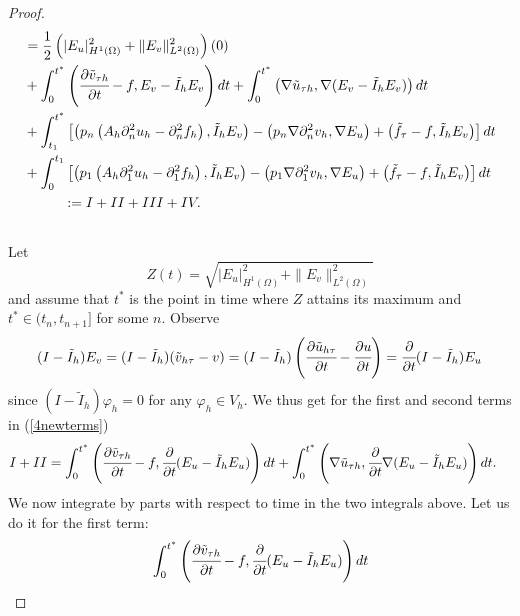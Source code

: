 \documentclass{imanum}
\begin{document}
\begin{proof}
\begin{align}
  &=
  {\frac{1}{2}} \left(|E_{u}|^{2}_{H^1(\Omega)}+\| E_{v}\|_{L^2(\Omega)}^{2}\right)(0)
  \notag\\
  &+ \int_{0}^{t^{{\ast}}}\left(\cfrac{{\partial\tilde{v}_{{\tau} h}}}{\partial t}-f, E_{v}-\tilde I_{h} E_{v}\right) d t
  +\int_{0}^{t^{{\ast}}}\left({\nabla} \tilde{u}_{{\tau} h},{\nabla} ( E_{v}-\tilde I_{h}  E_{v})\right) d t
 \notag \\
  &+\int_{t_1}^{t^{{\ast}}}\left[\left(p_n \left(A_h {\partial}_{n}^{2} u_{h}-{\partial}_{n}^{2}f_h\right),\tilde I_{h} E_{v}\right)-\left(p_n {\nabla}{\partial}_{n}^{2} v_{h},{\nabla}E_{u}\right)
  +\left(\tilde{f}_\tau-f,\tilde I_{h} E_{v}\right)\right] d t \notag\\
  &+\int_{0}^{t_1}\left[\left(p_1 \left(A_h {\partial}_{1}^{2} u_{h}-{\partial}_{1}^{2}f_h\right),\tilde I_{h} E_{v}\right)-\left(p_1 {\nabla}{\partial}_{1}^{2} v_{h},{\nabla}E_{u}\right)
  +\left(\tilde{f}_\tau-f,\tilde I_{h} E_{v}\right)\right] d t 
  \notag\\
  &\hspace{1cm}:=I+I I+I I I+IV .\notag
  \\
    \label{4newterms} 
  &
\end{align}
Let
\begin{equation*}
 Z (t) = \sqrt{| E_u |_{H^1(\Omega)}^2 + \| E_v \|_{L^2(\Omega)}^2}
\end{equation*}
and assume that $t^{\ast}$ is the point in time where $Z$ attains its maximum and $t^{\ast} \in (t_n, t_{n + 1}]$
for some $n$. Observe
\begin{equation*}
 (I-\tilde I_h)E_v  = (I-\tilde I_h)(\tilde{v}_{h\tau}-v )
  = (I-\tilde I_h)\left(\cfrac{\partial\tilde{u}_{h\tau}}{\partial t}-\cfrac{\partial u}{\partial t} \right)
  = \cfrac{\partial}{\partial t}(I-\tilde I_h)E_{u}
\end{equation*}
since $( I - \tilde I_h) \varphi_h =0$ for any $\varphi_h\in V_h$.
We thus get for the first and second terms in (\ref{4newterms})
\begin{align*}
  I + I I &
  =\int_{0}^{t^{{\ast}}}\left(\cfrac{{{\partial } \tilde{v}_{{\tau} h}}}{\partial t}-f,\cfrac{\partial}{\partial t} (E_{u}-\tilde I_{h} E_{u})\right) d t+\int_{0}^{t^{{\ast}}}\left({\nabla} \tilde{u}_{{\tau} h},\cfrac{\partial}{\partial t} {\nabla} (E_{u}-\tilde I_{h}  E_{u})\right) dt.
\end{align*}
We now integrate by parts with respect to time in the two integrals above.
Let us do it for the first term:
\begin{align*}
\nonumber & \int_{0}^{t^{{\ast}}}\left(\cfrac{{{\partial } \tilde{v}_{{\tau} h}}}{\partial t}-f,\cfrac{\partial}{\partial t} (E_{u}-\tilde I_{h} E_{u})\right) d t \\

\end{align*}
\end{proof}
\end{document}
